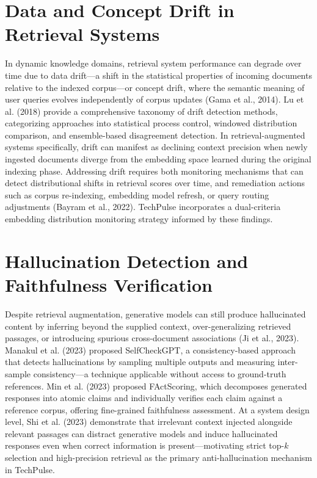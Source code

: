 \documentclass[12pt,a4paper]{report}
\begin{document}
\section{Data and Concept Drift in Retrieval Systems}
\label{sec:lit_drift}

In dynamic knowledge domains, retrieval system performance can degrade over time due to data drift---a shift in the statistical properties of incoming documents relative to the indexed corpus---or concept drift, where the semantic meaning of user queries evolves independently of corpus updates (Gama et al., 2014). Lu et al. (2018) provide a comprehensive taxonomy of drift detection methods, categorizing approaches into statistical process control, windowed distribution comparison, and ensemble-based disagreement detection. In retrieval-augmented systems specifically, drift can manifest as declining context precision when newly ingested documents diverge from the embedding space learned during the original indexing phase. Addressing drift requires both monitoring mechanisms that can detect distributional shifts in retrieval scores over time, and remediation actions such as corpus re-indexing, embedding model refresh, or query routing adjustments (Bayram et al., 2022). TechPulse incorporates a dual-criteria embedding distribution monitoring strategy informed by these findings.

\section{Hallucination Detection and Faithfulness Verification}
\label{sec:lit_hallucination}

Despite retrieval augmentation, generative models can still produce hallucinated content by inferring beyond the supplied context, over-generalizing retrieved passages, or introducing spurious cross-document associations (Ji et al., 2023). Manakul et al. (2023) proposed SelfCheckGPT, a consistency-based approach that detects hallucinations by sampling multiple outputs and measuring inter-sample consistency---a technique applicable without access to ground-truth references. Min et al. (2023) proposed FActScoring, which decomposes generated responses into atomic claims and individually verifies each claim against a reference corpus, offering fine-grained faithfulness assessment. At a system design level, Shi et al. (2023) demonstrate that irrelevant context injected alongside relevant passages can distract generative models and induce hallucinated responses even when correct information is present---motivating strict top-$k$ selection and high-precision retrieval as the primary anti-hallucination mechanism in TechPulse.
\end{document}
